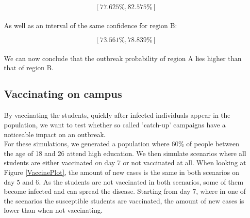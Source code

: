 \documentclass[runningheads]{llncs}
\begin{document}
$$ [77.625\%, 82.575\%] $$

\paragraph{} As well as an interval of the same confidence for region B:

$$ [73.561\%, 78.839\%] $$

\paragraph{} We can now conclude that the outbreak probability of region A lies higher than that of region B.

\subsection{Vaccinating on campus}

\paragraph{} By vaccinating the students, quickly after infected individuals appear in the population, we want to test whether so called 'catch-up' campaigns have a noticeable impact on an outbreak. \\
For these simulations, we generated a population where 60\% of people between the age of 18 and 26 attend high education. We then simulate scenarios where all students are either vaccinated on day 7 or not vaccinated at all. When looking at Figure \ref{VaccinePlot}, the amount of new cases is the same in both scenarios on day 5 and 6. As the students are not vaccinated in both scenarios, some of them become infected and can spread the disease. Starting from day 7, where in one of the scenarios the susceptible students are vaccinated, the amount of new cases is lower than when not vaccinating.
\end{document}
